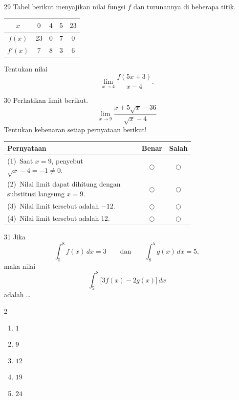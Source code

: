 \documentclass[11pt]{article}
\newenvironment{pilB}{%
  \par\smallskip\begin{multicols}{2}
  \begin{enumerate}[label=(\Alph*),leftmargin=*,itemsep=1pt,topsep=3pt]}%
  {\end{enumerate}\end{multicols}}
\begin{document}
\begin{soal}{29}
Tabel berikut menyajikan nilai fungsi $f$ dan turunannya di
beberapa titik.
\begin{center}
\begin{tabular}{c|cccc}
$x$ & $0$ & $4$ & $5$ & $23$ \\
\hline
$f(x)$ & $23$ & $0$ & $7$ & $0$ \\
$f'(x)$ & $7$ & $8$ & $3$ & $6$ \\
\end{tabular}
\end{center}
Tentukan nilai
\[
  \lim_{x\to 4}\frac{f(5x+3)}{x-4}.
\]
\end{soal}

\begin{soal}{30}
Perhatikan limit berikut.
\[
  \lim_{x\to 9}\frac{x+5\sqrt{x}-36}{\sqrt{x}-4}
\]
Tentukan kebenaran setiap pernyataan berikut!

\par\smallskip
{\renewcommand{\arraystretch}{1.4}%
\begin{tabular}{@{}p{0.76\linewidth}cc@{}}
\hline
\textbf{Pernyataan} & \textbf{Benar} & \textbf{Salah}\\
\hline
(1)~Saat $x=9$, penyebut $\sqrt{x}-4=-1\neq0$.
  & $\bigcirc$ & $\bigcirc$\\
(2)~Nilai limit dapat dihitung dengan substitusi langsung $x=9$.
  & $\bigcirc$ & $\bigcirc$\\
(3)~Nilai limit tersebut adalah $-12$.
  & $\bigcirc$ & $\bigcirc$\\
(4)~Nilai limit tersebut adalah $12$.
  & $\bigcirc$ & $\bigcirc$\\
\hline
\end{tabular}}
\end{soal}

\begin{soal}{31}
Jika
\[
  \int_5^8 f(x)\,dx=3
  \qquad\text{dan}\qquad
  \int_8^5 g(x)\,dx=5,
\]
maka nilai
\[
  \int_5^8\bigl[3f(x)-2g(x)\bigr]\,dx
\]
adalah \ldots
\begin{pilB}
  \item $1$ \item $9$ \item $12$ \item $19$ \item $24$
\end{pilB}
\end{soal}
\end{document}
